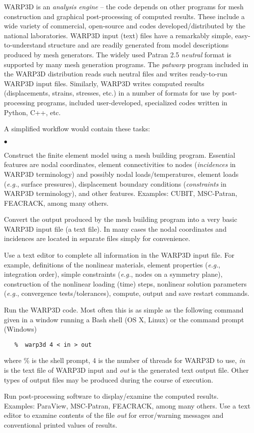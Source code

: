 \documentclass[11pt]{report}
\numberwithin{equation}{section}
\newcommand{\eg}{\emph{e.g.},\xspace}
\newcommand{\ti}{\emph}
\newcommand{\nid}{\noindent}
\newcommand{\squishlist}{
 \begin{list}{$\bullet$}
  { \setlength{\itemsep}{0pt}
     \setlength{\parsep}{3pt}
     \setlength{\topsep}{3pt}
     \setlength{\partopsep}{0pt}
     \setlength{\leftmargin}{1.5em}
     \setlength{\labelwidth}{1em}
     \setlength{\labelsep}{0.5em} } }
\newcommand{\squishend}{
  \end{list}  }
\begin{document}
WARP3D is an \ti{analysis engine} -- the code depends on other programs
for mesh construction and graphical post-processing of computed results.
These include a wide variety of commercial, open-source and codes developed/distributed
by the national laboratories. WARP3D input (text) files have a remarkably
simple, easy-to-understand structure and are readily generated from model descriptions
produced by mesh generators. The widely used Patran 2.5 \ti{neutral} format is
supported by many mesh generation programs. The \ti{patwarp} program included in the
WARP3D distribution reads such neutral files and writes ready-to-run WARP3D 
input files. Similarly, WARP3D writes computed results (displacements, strains,
stresses, etc.) in a number of formats for use by post-processing programs,
included user-developed, specialized codes written in Python, C++, etc.

\nid A simplified workflow would contain these tasks:
\small
\squishlist
\item	Construct the finite element model using a mesh building program. Essential features
are nodal coordinates, element connectivities to nodes (\ti{incidences} in WARP3D
terminology) and possibly nodal loads/temperatures, element loads
(\eg surface pressures), displacement boundary conditions (\ti{constraints}
in WARP3D terminology), and other features. Examples: CUBIT, MSC-Patran,
FEACRACK, among many others.
\item	 Convert the output produced by the mesh building program into a very basic
WARP3D input file (a text file). In many cases the nodal coordinates and incidences
are located in separate files simply for convenience.
\item Use a text editor to complete all information in the WARP3D input file. For example,
definitions of the nonlinear materials, element properties (\eg integration order),
simple constraints (\eg nodes on a symmetry plane), construction of the nonlinear loading
(time) steps, nonlinear solution parameters (\eg convergence tests/tolerances), compute,
output and save restart commands.
\item Run the WARP3D code. Most often this is as simple as the following
command given in a window running a Bash shell (OS X, Linux) or the 
command prompt (Windows)
\small \begin{verbatim}
   %  warp3d 4 < in > out
\end{verbatim}
\nid where \% is the shell prompt, 4 is the number of threads for WARP3D to use, 
\ti{in} is the text file of WARP3D input and \ti{out} is the generated text output
file. Other types of output files may be produced during the course of execution.
\item Run post-processing software to display/examine the computed results.
Examples: ParaView, MSC-Patran, FEACRACK, among many others. Use a text editor
to examine contents of the file \ti{out} for error/warning messages and conventional
printed values of results.
\squishend \normalsize
\end{document}
